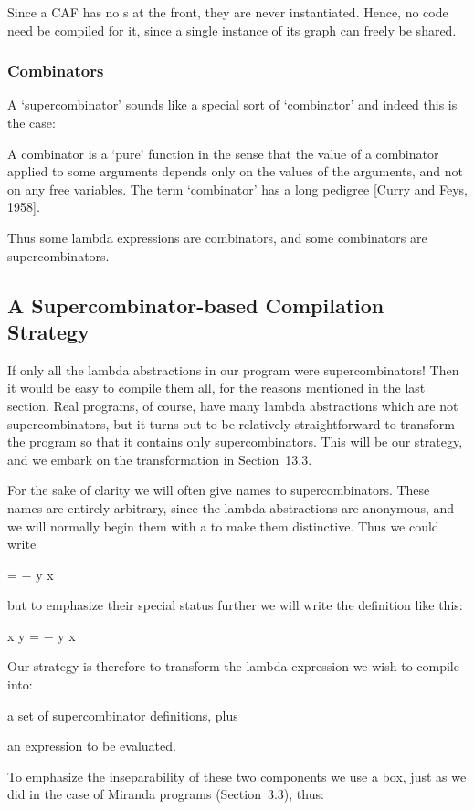 Since a CAF has no \ml{\tl}s at the front, they are never instantiated. Hence, no
code need be compiled for it, since a single instance of its graph can freely be
shared.

\subsubsection{Combinators}

A `supercombinator' sounds like a special sort of `combinator' and indeed this
is the case:


\noindent
A combinator is a `pure' function in the sense that the value of a combinator
applied to some arguments depends only on the values of the arguments, and
not on any free variables. The term `combinator' has a long pedigree [Curry
and Feys, 1958].

Thus some lambda expressions are combinators, and some combinators are
supercombinators.

\subsection{A Supercombinator-based Compilation Strategy}

If only all the lambda abstractions in our program were supercombinators!
Then it would be easy to compile them all, for the reasons mentioned in the
last section. Real programs, of course, have many lambda abstractions which
are not supercombinators, but it turns out to be relatively straightforward to
transform the program so that it contains only supercombinators. This will be
our strategy, and we embark on the transformation in Section~13.3.

For the sake of clarity we will often give names to supercombinators. These
names are entirely arbitrary, since the lambda abstractions are anonymous,
and we will normally begin them with a \ml{\$} to make them distinctive. Thus we
could write
\begin{letalign}
     = $-$ y x
\end{letalign}
but to emphasize their special status further we will write the definition like
this:
\begin{letalign}
     x y = $-$ y x
\end{letalign}
Our strategy is therefore to transform the lambda expression we wish to
compile into:
\begin{numbered}
    \item a set of supercombinator definitions, plus
    \item an expression to be evaluated.
\end{numbered}
To emphasize the inseparability of these two components we use a box, just as
we did in the case of Miranda programs (Section~3.3), thus:


